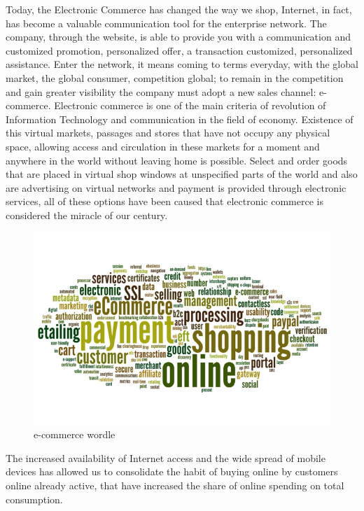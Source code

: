 Today, the Electronic Commerce has changed the way we shop, Internet, in fact, has become a valuable communication tool for the enterprise network.
The company, through the website, is able to provide you with a communication and customized promotion, personalized offer, a transaction customized, personalized assistance. Enter the network, it means coming to terms everyday, with the global market, the global consumer, competition global; to remain in the competition and gain greater visibility the company must adopt a new sales channel: e-commerce.
\newline
Electronic commerce is one of the main criteria of revolution of Information Technology and communication in the field of economy. Existence of this virtual markets, passages and stores that have not occupy any physical space, allowing access and circulation in these markets for a moment and anywhere in the world without leaving home is possible. Select and order goods that are placed in virtual shop windows at unspecified parts of the world and also are advertising on virtual networks and payment is provided through electronic services, all of these options have been caused that electronic commerce is considered the miracle of our century.
\newline
\begin{figure}[htb]
 \centering
 \includegraphics[width=1.0\linewidth]{images/introduction/ecommerce-wordle.jpg}\hfill
 \caption[e-commerce wordle]{e-commerce wordle}
 \label{fig:e_commerce_wordle}
\end{figure}
The increased availability of Internet access and the wide spread of mobile devices has allowed us to consolidate the habit of buying online by customers online already active, that have increased the share of online spending on total consumption.
